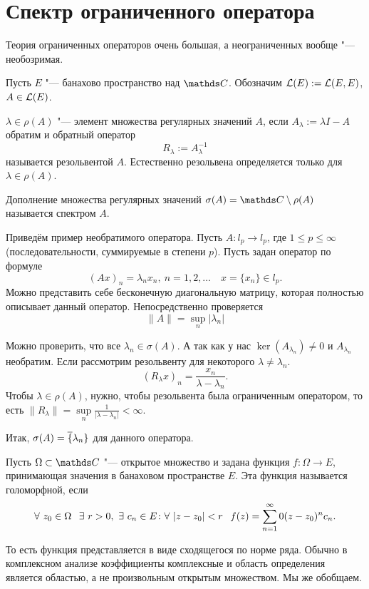 \section{Спектр ограниченного оператора}
Теория ограниченных операторов очень большая, а неограниченных вообще "--- необозримая.

Пусть $E$ "--- банахово пространство над $\C$.  Обозначим $\mathcal L(E) := \mathcal L(E,E)$, $A\in\mathcal L(E)$.
\begin{Def}
  $\lambda\in \rho(A)$ "--- элемент множества регулярных значений $A$, если $A_\lambda:=\lambda I - A$ обратим и обратный оператор
\[
  R_\lambda:=A^{-1}_\lambda
\]
называется резольвентой $A$. Естественно резольвена определяется только для $\lambda\in \rho(A)$.
\end{Def}

\begin{Def}
  Дополнение множества регулярных значений $\sigma(A) = \C\dd \rho(A)$ называется спектром $A$.
\end{Def}

Приведём пример необратимого оператора. Пусть $A\colon l_p\to l_p$, где $1\le p\le \infty$ (последовательности, суммируемые в степени $p$). Пусть задан оператор по формуле
\[
  (Ax)_n = \lambda_n x_n,\ n=1,2,\dots\quad x = \{x_n\}\in l_p.
\]
Можно представить себе бесконечную диагональную матрицу, которая полностью описывает данный оператор. Непосредственно проверяется
\[
  \|A\| = \sup\limits_n|\lambda_n|
\]

Можно проверить, что все $\lambda_n\in\sigma(A)$. А так как у нас $\ker(A_{\lambda_n})\ne0$ и $A_{\lambda_n}$ необратим. Если рассмотрим резольвенту для некоторого $\lambda\ne \lambda_n$.
\[
  (R_\lambda x)_n = \frac{x_n}{\lambda-\lambda_n}.
\]
Чтобы $\lambda\in \rho(A)$, нужно, чтобы резольвента была ограниченным оператором, то есть $\|R_\lambda\| = \sup\limits_n\frac1{|\lambda-\lambda_n|}<\infty$.

Итак, $\sigma(A) = \overline{\{}\lambda_n\}$ для данного оператора.

\begin{Def}
  Пусть $\Omega\subset\C$ "--- открытое множество и задана функция $f\colon \Omega\to E$, принимающая значения в банаховом пространстве $E$. Эта функция называется голоморфной, если
\[
  \forall\ z_0\in \Omega\pau \exists\ r>0,\ \exists\ c_n\in E\colon 
	\forall\ |z-z_0|<r\pau f(z) = \rY n0 (z-z_0)^n c_n.
\]
\end{Def}
То есть функция представляется в виде сходящегося по норме ряда. Обычно в комплексном анализе коэффициенты комплексные и область определения является областью, а не произвольным открытым множеством. Мы же обобщаем.

